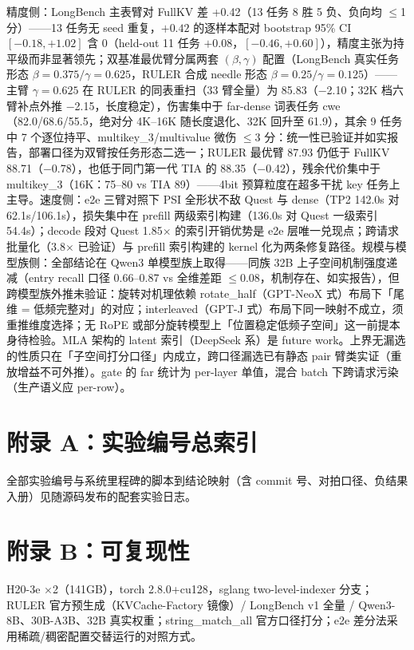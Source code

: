 \documentclass[11pt]{article}
\begin{document}
精度侧：LongBench 主表臂对 FullKV 差 +0.42（13 任务 8 胜 5 负、负向均 $\leq$1 分）——13 任务无 seed 重复，$+0.42$ 的逐样本配对 bootstrap 95\% CI $[-0.18, +1.02]$ 含 0（held-out 11 任务 $+0.08$，$[-0.46, +0.60]$），精度主张为持平级而非显著领先；双基准最优臂分属两套 $(\beta,\gamma)$ 配置（LongBench 真实任务形态 $\beta{=}0.375/\gamma{=}0.625$，RULER 合成 needle 形态 $\beta{=}0.25/\gamma{=}0.125$）——主臂 $\gamma{=}0.625$ 在 RULER 的同表重扫（33 臂全量）为 85.83（$-$2.10；32K 档六臂补点外推 $-$2.15，长度稳定），伤害集中于 far-dense 词表任务 cwe（82.0/68.6/55.5，绝对分 4K--16K 随长度退化、32K 回升至 61.9），其余 9 任务中 7 个逐位持平、multikey\_3/multivalue 微伤 $\leq$3 分：统一性已验证并如实报告，部署口径为双臂按任务形态二选一；RULER 最优臂 87.93 仍低于 FullKV 88.71（$-$0.78），也低于同门第一代 TIA 的 88.35（$-$0.42），残余代价集中于 multikey\_3（16K：75--80 vs TIA 89）——4bit 预算粒度在超多干扰 key 任务上主导。速度侧：e2e 三臂对照下 PSI 全形状不敌 Quest 与 dense（TP2 142.0s 对 62.1s/106.1s），损失集中在 prefill 两级索引构建（136.0s 对 Quest 一级索引 54.4s）；decode 段对 Quest 1.85$\times$ 的索引开销优势是 e2e 层唯一兑现点；跨请求批量化（3.8$\times$ 已验证）与 prefill 索引构建的 kernel 化为两条修复路径。规模与模型族侧：全部结论在 Qwen3 单模型族上取得——同族 32B 上子空间机制强度递减（entry recall 口径 0.66--0.87 vs 全维差距 $\le$0.08，机制存在、如实报告），但跨模型族外推未验证：旋转对机理依赖 rotate\_half（GPT-NeoX 式）布局下「尾维 = 低频完整对」的对应；interleaved（GPT-J 式）布局下同一映射不成立，须重推维度选择；无 RoPE 或部分旋转模型上「位置稳定低频子空间」这一前提本身待检验。MLA 架构的 latent 索引（DeepSeek 系）是 future work。上界无漏选的性质只在「子空间打分口径」内成立，跨口径漏选已有静态 pair 臂类实证（重放增益不可外推）。gate 的 far 统计为 per-layer 单值，混合 batch 下跨请求污染（生产语义应 per-row）。

\section*{附录 A：实验编号总索引}
全部实验编号与系统里程碑的脚本到结论映射（含 commit 号、对拍口径、负结果入册）见随源码发布的配套实验日志。

\section*{附录 B：可复现性}
H20-3e $\times$2（141GB），torch 2.8.0+cu128，sglang two-level-indexer 分支；RULER 官方预生成（KVCache-Factory 镜像）/ LongBench v1 全量 / Qwen3-8B、30B-A3B、32B 真实权重；string\_match\_all 官方口径打分；e2e 差分法采用稀疏/稠密配置交替运行的对照方式。
\end{document}

